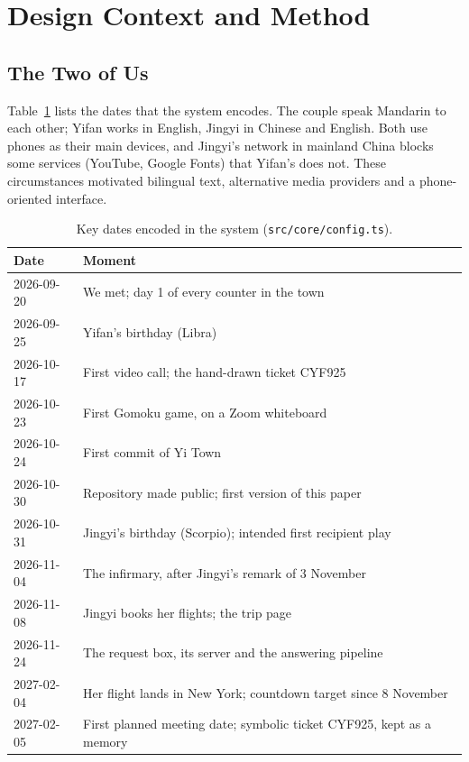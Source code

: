 \documentclass[sigconf,nonacm]{acmart}
\newcommand{\yt}{Yi Town}
\newcommand{\code}[1]{\textnormal{\texttt{\small #1}}}
\begin{document}

\section{Design Context and Method}\label{sec:method}

\subsection{The Two of Us}
Table~\ref{tab:dates} lists the dates that the system encodes. The couple speak Mandarin to each
other; Yifan works in English, Jingyi in Chinese and English. Both use phones as their main
devices, and Jingyi's network in mainland China blocks some services (YouTube, Google Fonts) that
Yifan's does not. These circumstances motivated bilingual text, alternative media providers and a
phone-oriented interface.

\begin{table}[t]
  \caption{Key dates encoded in the system (\code{src/core/config.ts}).}
  \label{tab:dates}
  \small
  \begin{tabular}{@{}lp{}@{}}
    \toprule
    Date & Moment \\
    \midrule
    2026-09-20 & We met; day 1 of every counter in the town \\
    2026-09-25 & Yifan's birthday (Libra) \\
    2026-10-17 & First video call; the hand-drawn ticket CYF925 \\
    2026-10-23 & First Gomoku game, on a Zoom whiteboard \\
    2026-10-24 & First commit of \yt{} \\
    2026-10-30 & Repository made public; first version of this paper \\
    2026-10-31 & Jingyi's birthday (Scorpio); intended first recipient play \\
    2026-11-04 & The infirmary, after Jingyi's remark of 3 November \\
    2026-11-08 & Jingyi books her flights; the trip page \\
    2026-11-24 & The request box, its server and the answering pipeline \\
    2027-02-04 & Her flight lands in New York; countdown target since 8 November \\
    2027-02-05 & First planned meeting date; symbolic ticket CYF925, kept as a memory \\
    \bottomrule
  \end{tabular}
\end{table}
\end{document}
